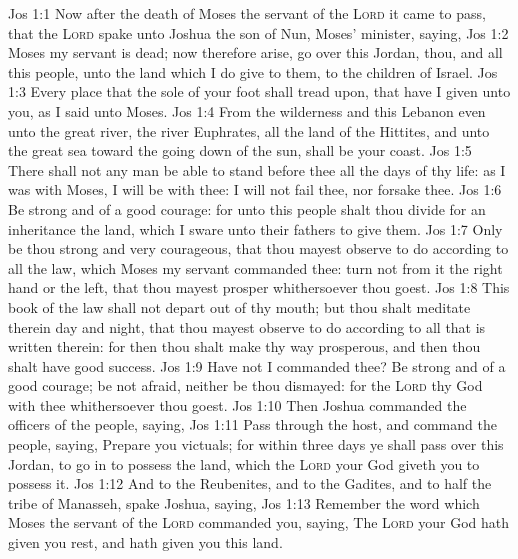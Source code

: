 \vs Jos 1:1 Now after the death of Moses the servant of the \textsc{Lord} it came to pass, that the \textsc{Lord} spake unto Joshua the son of Nun, Moses' minister, saying,
\vs Jos 1:2 Moses my servant is dead; now therefore arise, go over this Jordan, thou, and all this people, unto the land which I do give to them,  to the children of Israel.
\vs Jos 1:3 Every place that the sole of your foot shall tread upon, that have I given unto you, as I said unto Moses.
\vs Jos 1:4 From the wilderness and this Lebanon even unto the great river, the river Euphrates, all the land of the Hittites, and unto the great sea toward the going down of the sun, shall be your coast.
\vs Jos 1:5 There shall not any man be able to stand before thee all the days of thy life: as I was with Moses,  I will be with thee: I will not fail thee, nor forsake thee.
\vs Jos 1:6 Be strong and of a good courage: for unto this people shalt thou divide for an inheritance the land, which I sware unto their fathers to give them.
\vs Jos 1:7 Only be thou strong and very courageous, that thou mayest observe to do according to all the law, which Moses my servant commanded thee: turn not from it  the right hand or  the left, that thou mayest prosper whithersoever thou goest.
\vs Jos 1:8 This book of the law shall not depart out of thy mouth; but thou shalt meditate therein day and night, that thou mayest observe to do according to all that is written therein: for then thou shalt make thy way prosperous, and then thou shalt have good success.
\vs Jos 1:9 Have not I commanded thee? Be strong and of a good courage; be not afraid, neither be thou dismayed: for the \textsc{Lord} thy God  with thee whithersoever thou goest.
\vs Jos 1:10 Then Joshua commanded the officers of the people, saying,
\vs Jos 1:11 Pass through the host, and command the people, saying, Prepare you victuals; for within three days ye shall pass over this Jordan, to go in to possess the land, which the \textsc{Lord} your God giveth you to possess it.
\vs Jos 1:12 And to the Reubenites, and to the Gadites, and to half the tribe of Manasseh, spake Joshua, saying,
\vs Jos 1:13 Remember the word which Moses the servant of the \textsc{Lord} commanded you, saying, The \textsc{Lord} your God hath given you rest, and hath given you this land.
